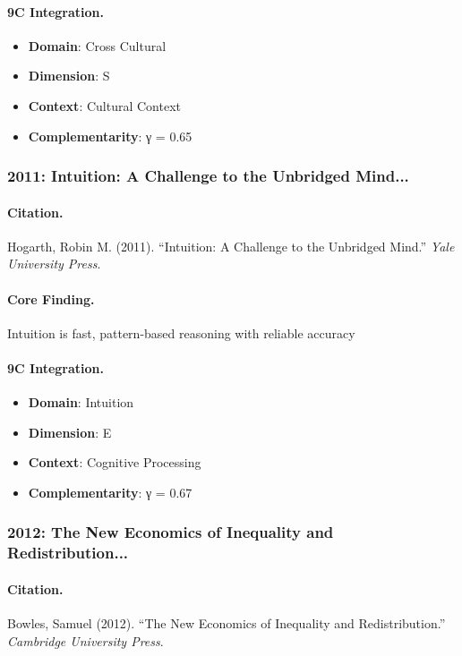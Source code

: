 \paragraph{9C Integration.}
\begin{itemize}[nosep]
  \item \textbf{Domain}: Cross Cultural
  \item \textbf{Dimension}: S
  \item \textbf{Context}: Cultural Context
  \item \textbf{Complementarity}: γ = 0.65
\end{itemize}

\subsubsection{2011: Intuition: A Challenge to the Unbridged Mind...}

\paragraph{Citation.}
Hogarth, Robin M. (2011). ``Intuition: A Challenge to the Unbridged Mind.''
\textit{Yale University Press}.

\paragraph{Core Finding.}
Intuition is fast, pattern-based reasoning with reliable accuracy

\paragraph{9C Integration.}
\begin{itemize}[nosep]
  \item \textbf{Domain}: Intuition
  \item \textbf{Dimension}: E
  \item \textbf{Context}: Cognitive Processing
  \item \textbf{Complementarity}: γ = 0.67
\end{itemize}

\subsubsection{2012: The New Economics of Inequality and Redistribution...}

\paragraph{Citation.}
Bowles, Samuel (2012). ``The New Economics of Inequality and Redistribution.''
\textit{Cambridge University Press}.

